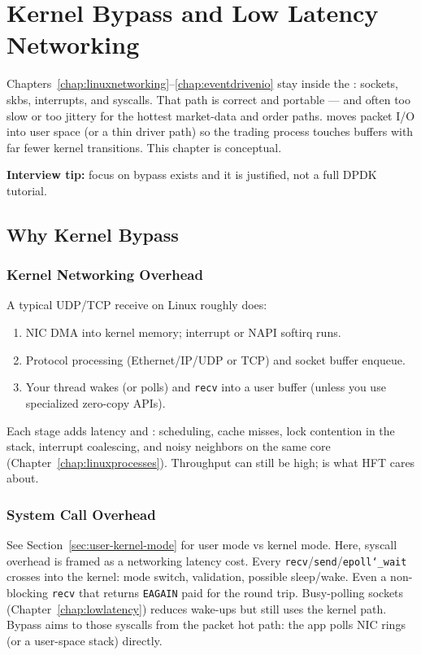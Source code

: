 \chapter{Kernel Bypass and Low Latency Networking}
\label{chap:kernelbypass}

Chapters~\ref{chap:linuxnetworking}--\ref{chap:eventdrivenio} stay inside the 
: sockets, skbs, interrupts, and syscalls. 
That path is correct and portable --- and often too slow or too jittery for the hottest 
market-data and order paths.  moves packet I/O into user space 
(or a thin driver path) so the trading process touches buffers with far fewer kernel 
transitions.
\newline
This chapter is conceptual.
\par\noindent\textbf{Interview tip:} focus on  bypass exists and 
 it is justified, not a full DPDK tutorial.

\section{Why Kernel Bypass}
\label{sec:why-kernel-bypass}

\subsection{Kernel Networking Overhead}
\label{subsec:kernel-networking-overhead}
A typical UDP/TCP receive on Linux roughly does:
\begin{enumerate}
    \item NIC DMA into kernel memory; interrupt or NAPI softirq runs.
    \item Protocol processing (Ethernet/IP/UDP or TCP) and socket buffer enqueue.
    \item Your thread wakes (or polls) and \texttt{recv}  into a user buffer 
          (unless you use specialized zero-copy APIs).
\end{enumerate}
Each stage adds latency and : scheduling, cache misses, lock contention 
in the stack, interrupt coalescing, and noisy neighbors on the same core 
(Chapter~\ref{chap:linuxprocesses}). Throughput can still be high; 
 is what HFT cares about.

\subsection{System Call Overhead}
\label{subsec:syscall-overhead}
See Section~\ref{sec:user-kernel-mode} for user mode vs kernel mode. 
Here, syscall overhead is framed as a networking latency cost.
\newline
Every \texttt{recv}/\texttt{send}/\texttt{epoll\char`_wait} crosses into the kernel: mode 
switch, validation, possible sleep/wake. Even a non-blocking \texttt{recv} that returns 
\texttt{EAGAIN} paid for the round trip. Busy-polling sockets 
(Chapter~\ref{chap:lowlatency}) reduces wake-ups but still uses the kernel path. 
Bypass aims to  those syscalls from the packet hot path: the app polls 
NIC rings (or a user-space stack) directly.

